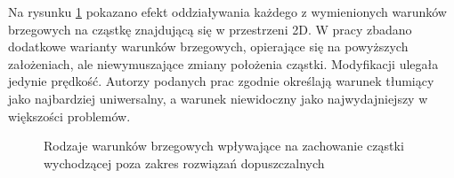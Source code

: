 Na rysunku \ref{fig: pso_bounds_types} pokazano efekt oddziaływania każdego z wymienionych warunków brzegowych na cząstkę znajdującą się w przestrzeni 2D.  W pracy \parencite{Xu2007} zbadano dodatkowe warianty warunków brzegowych, opierające się na powyższych założeniach, ale niewymuszające zmiany położenia cząstki. Modyfikacji ulegała jedynie prędkość. Autorzy podanych prac zgodnie określają warunek tłumiący jako najbardziej uniwersalny, a warunek niewidoczny jako najwydajniejszy w większości problemów.

\begin{figure}[hbt!]
	\centering
	\captionsetup{justification=centering}
	\caption{Rodzaje warunków brzegowych wpływające na zachowanie cząstki wychodzącej poza zakres rozwiązań dopuszczalnych}
	\label{fig: pso_bounds_types}
\end{figure}


